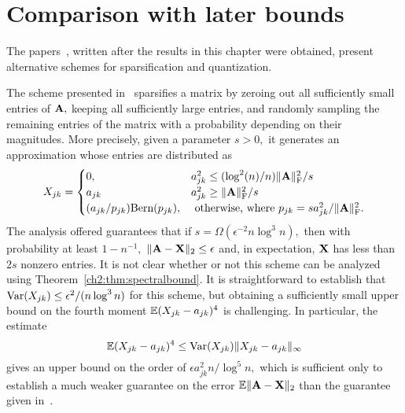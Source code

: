 \section{Comparison with later bounds}

The papers~\cite{DNT10,DZ11,AKL13}, written after the results in this chapter were obtained,
present alternative schemes for sparsification and quantization. 

The scheme presented in~\cite{DNT10}
sparsifies a matrix by zeroing out all sufficiently small entries of $\mathbf{A},$ keeping all sufficiently
large entries, and randomly sampling the remaining entries of the matrix with a probability depending
on their magnitudes. More precisely, given a parameter $s > 0,$ it generates an approximation whose entries are distributed as
\[
 X_{jk}=\begin{cases}
 0,  & a_{jk}^2 \leq (\log^2(n)/n) \|\mathbf{A}\|_{\mathrm{F}}^2/s \\
 a_{jk} & a_{jk}^2 \geq \|\mathbf{A}\|_{\mathrm{F}}^2/s \\
 (a_{jk}/p_{jk}) \text{Bern}(p_{jk}), & \text{ otherwise, where } p_{jk} = s a_{jk}^2/\|\mathbf{A}\|_{\mathrm{F}}^2.
\end{cases}
\]
The analysis offered guarantees that if $s = \Omega(\epsilon^{-2} n \log^3 n),$ then with probability at least $1 - n^{-1},$
$\|\mathbf{A} - \mathbf{X}\|_2 \leq \epsilon$ and, in expectation, $\mathbf{X}$ has less than $2s$ nonzero entries. It is not clear 
whether or not this scheme can be analyzed using Theorem~\ref{ch2:thm:spectralbound}. It is straightforward to establish that
$\operatorname{Var}(X_{jk}) \leq \epsilon^2/(n \log^3 n)$ for this scheme, but obtaining a sufficiently small upper bound on the fourth moment
$\mathbb{E}(X_{jk} - a_{jk})^4$ is challenging. In particular, the estimate 
\[
 \mathbb{E}(X_{jk} - a_{jk})^4 \leq \operatorname{Var}(X_{jk}) \|X_{jk} - a_{jk}\|_\infty
\]
gives an upper bound on the order of $\epsilon a_{jk}^2 n / \log^5 n,$ which is sufficient only to establish a much weaker
guarantee on the error $\mathbb{E}\|\mathbf{A} - \mathbf{X}\|_2$ than the guarantee given in~\cite{DNT10}.

